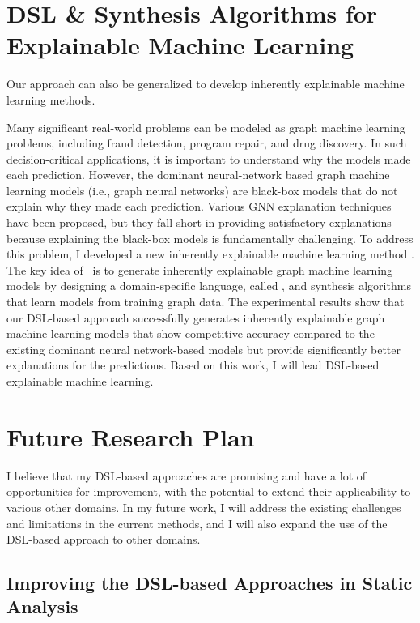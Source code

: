 \documentclass[11pt]{article}
\newcommand{\myparagraph}[1]{\medskip\noindent{\it \textbf{#1.}}}
\begin{document}
\section{DSL \& Synthesis Algorithms for Explainable Machine Learning}
%
Our approach can also be generalized to develop inherently explainable machine learning methods. 
%

\myparagraph{PL4XGL}
Many significant real-world problems can be modeled as graph machine learning problems, including fraud detection, program repair, and drug discovery.
%
In such decision-critical applications, it is important to understand why the models made each prediction.
%
However, the dominant neural-network based graph machine learning models (i.e., graph neural networks) are black-box models that do not explain why they made each prediction.
%
Various GNN explanation techniques have been proposed, but they fall short in providing satisfactory explanations because explaining the black-box models is fundamentally challenging.
%
To address this problem, I developed a new inherently explainable machine learning method {\PLXGL}.
%
The key idea of \PLXGL~is to generate inherently explainable graph machine learning models by designing a domain-specific language, called \GDL, and synthesis algorithms that learn models from training graph data.
%
The experimental results show that our DSL-based approach successfully generates inherently explainable graph machine learning models that show competitive accuracy compared to the existing dominant neural network-based models but provide significantly better explanations for the predictions.
%
Based on this work, I will lead DSL-based explainable machine learning.



\section{Future Research Plan}
I believe that my DSL-based approaches are promising and have a lot of opportunities for improvement, with the potential to extend their applicability to various other domains.
%
In my future work, I will address the existing challenges and limitations in the current methods, and I will also expand the use of the DSL-based approach to other domains.


\subsection{Improving the DSL-based Approaches in Static Analysis}
\end{document}

